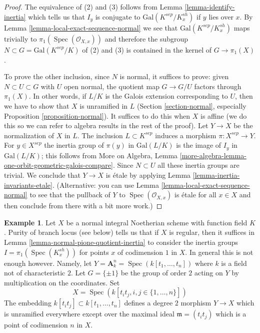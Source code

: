 \documentclass{stacks-project}
\theoremstyle{plain}
\theoremstyle{definition}
\newtheorem{example}[subsection]{Example}
\theoremstyle{remark}
\numberwithin{equation}{subsection}
\def\Spec{\mathop{\mathrm{Spec}}}
\begin{document}
\begin{proof}
The equivalence of (2) and (3) follows from
Lemma \ref{lemma-identify-inertia}
which tells us that $I_y$ is conjugate to $\text{Gal}(K^{sep}/K_x^{sh})$
if $y$ lies over $x$. By Lemma \ref{lemma-local-exact-sequence-normal}
we see that $\text{Gal}(K^{sep}/K_x^{sh})$ maps trivially to
$\pi_1(\Spec(\mathcal{O}_{X, x}))$ and therefore the subgroup
$N \subset G = \text{Gal}(K^{sep}/K)$
of (2) and (3) is contained in the kernel of
$G \longrightarrow \pi_1(X)$.

\medskip\noindent
To prove the other inclusion, since $N$ is normal, it suffices to prove:
given $N \subset U \subset G$ with $U$ open normal,
the quotient map $G \to G/U$ factors through $\pi_1(X)$.
In other words, if $L/K$ is the Galois extension corresponding
to $U$, then we have to show that $X$ is unramified in $L$
(Section \ref{section-normal}, especially
Proposition \ref{proposition-normal}).
It suffices to do this when $X$ is affine (we do this
so we can refer to algebra results in the rest of the proof).
Let $Y \to X$ be the normalization of $X$ in $L$.
The inclusion $L \subset K^{sep}$ induces a morphism
$\pi : X^{sep} \to Y$. For $y \in X^{sep}$
the inertia group of $\pi(y)$ in $\text{Gal}(L/K)$
is the image of $I_y$ in $\text{Gal}(L/K)$; this follows
from More on Algebra, Lemma
\ref{more-algebra-lemma-one-orbit-geometric-galois-compare}.
Since $N \subset U$ all these inertia groups are trivial.
We conclude that $Y \to X$ is \'etale by applying
Lemma \ref{lemma-inertia-invariants-etale}.
(Alternative: you can use Lemma \ref{lemma-local-exact-sequence-normal}
to see that the pullback of $Y$ to $\Spec(\mathcal{O}_{X, x})$ is
\'etale for all $x \in X$ and then conclude from there
with a bit more work.)
\end{proof}

\begin{example}
\label{example-bigger-codim}
Let $X$ be a normal integral Noetherian scheme with function field $K$.
Purity of branch locus (see below) tells us that if $X$ is regular, then
it suffices in Lemma \ref{lemma-normal-pione-quotient-inertia}
to consider the inertia groups $I = \pi_1(\Spec(K_x^{sh}))$
for points $x$ of codimension $1$ in $X$.
In general this is not enough however. Namely, let
$Y = \mathbf{A}_k^n = \Spec(k[t_1, \ldots, t_n])$
where $k$ is a field not of characteristic $2$.
Let $G = \{\pm 1\}$ be the group of order $2$ acting on $Y$
by multiplication on the coordinates. Set
$$
X = \Spec(k[t_it_j, i, j \in \{1, \ldots, n\}])
$$
The embedding $k[t_it_j] \subset k[t_1, \ldots, t_n]$
defines a degree $2$ morphism $Y \to X$ which is unramified everywhere
except over the maximal ideal $\mathfrak m = (t_it_j)$
which is a point of codimension $n$ in $X$.
\end{example}
\end{document}
